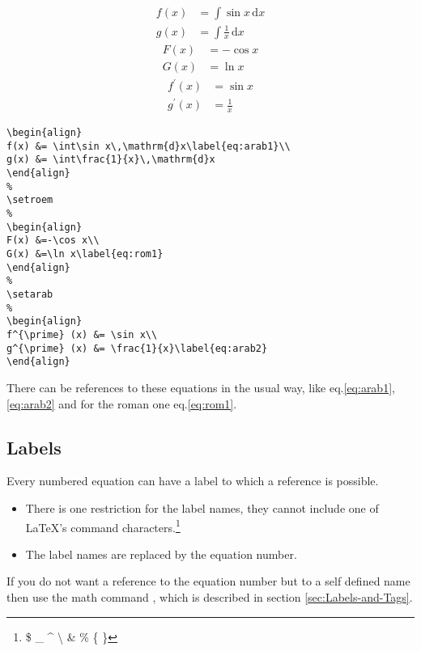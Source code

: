 \noindent
\begin{minipage}{1.2\linewidth}
\begin{minipage}{0.38\linewidth}
\begin{align}
f(x) &= \int\sin x\,\mathrm{d}x\label{eq:arab1}\\
g(x) &= \int\frac{1}{x}\,\mathrm{d}x
\end{align}
%
\setroem
%
\begin{align}
F(x) &=-\cos x\\
G(x) &=\ln x\label{eq:rom1}
\end{align}
%
\setarab
%
\begin{align}
f^{\prime} (x) &= \sin x\\
g^{\prime} (x) &= \frac{1}{x}\label{eq:arab2}
\end{align}
\end{minipage}\hfill
\begin{minipage}{0.58\linewidth}
\begin{lstlisting}
\begin{align}
f(x) &= \int\sin x\,\mathrm{d}x\label{eq:arab1}\\
g(x) &= \int\frac{1}{x}\,\mathrm{d}x
\end{align}
%
\setroem
%
\begin{align}
F(x) &=-\cos x\\
G(x) &=\ln x\label{eq:rom1}
\end{align}
%
\setarab
%
\begin{align}
f^{\prime} (x) &= \sin x\\
g^{\prime} (x) &= \frac{1}{x}\label{eq:arab2}
\end{align}
\end{lstlisting}
\end{minipage}
\end{minipage}

\medskip
There can be references to these equations in the usual way, like eq.\ref{eq:arab1},
\ref{eq:arab2} and for the roman one eq.\ref{eq:rom1}.


\subsection{Labels}\label{sec:Labels}

Every numbered equation can have a label to which a
reference is possible.

\begin{itemize}
\item There is one restriction for the label names, they cannot include
one of \LaTeX{}'s command characters.\footnote{\$ \_ \^{} \textbackslash{} \& \% \{ \}}
\item The label names are replaced by the equation number.
\end{itemize}
%
If you do not want a reference to the equation number but to a self
defined name then use the \AmS{}math command ,
which is described in section \vref{sec:Labels-and-Tags}.

